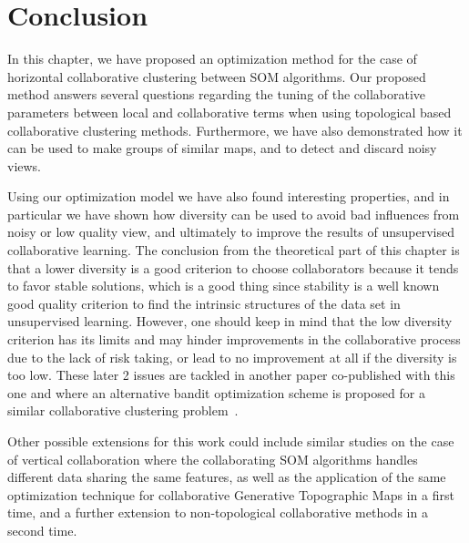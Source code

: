 \section{Conclusion}
\label{sec:cc-conlu}

In this chapter, we have proposed an optimization method for the case of horizontal collaborative clustering between SOM algorithms. Our proposed method answers several questions regarding the tuning of the collaborative parameters between local and collaborative terms when using topological based collaborative clustering methods. Furthermore, we have also demonstrated how it can be used to make groups of similar maps, and to detect and discard noisy views.

Using our optimization model we have also found interesting properties, and in particular we have shown how diversity can be used to avoid bad influences from noisy or low quality view, and ultimately to improve the results of unsupervised collaborative learning. The conclusion from the theoretical part of this chapter is that a lower diversity is a good criterion to choose collaborators because it tends to favor stable solutions, which is a good thing since stability is a well known good quality criterion to find the intrinsic structures of the data set in unsupervised learning. However, one should keep in mind that the low diversity criterion has its limits and may hinder improvements in the collaborative process due to the lack of risk taking, or lead to no improvement at all if the diversity is too low. These later 2 issues are tackled in another paper co-published with this one and where an alternative bandit optimization scheme is proposed for a similar collaborative clustering problem~\cite{Sublime2018a2}. 


Other possible extensions for this work could include similar studies on the case of vertical collaboration where the collaborating SOM algorithms handles different data sharing the same features, as well as the application of the same optimization technique for collaborative Generative Topographic Maps in a first time, and a further extension to non-topological collaborative methods in a second time.



